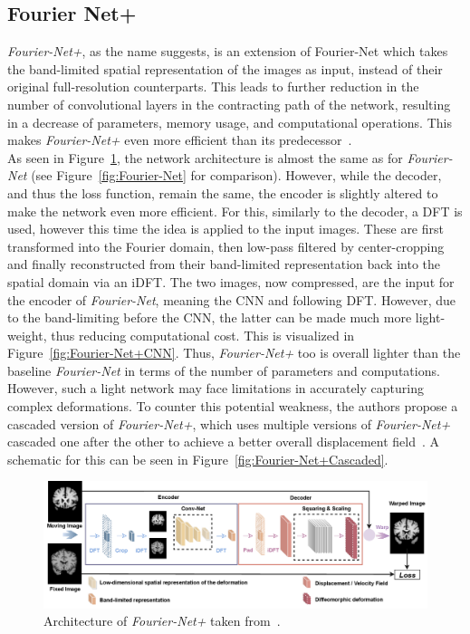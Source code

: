 \documentclass[english,version-2022-01]{uzl-thesis} %
\begin{document}
\subsection{Fourier Net+} \label{SubSec:Fourier-Net+}
\emph{Fourier-Net+}, as the name suggests, is an extension of Fourier-Net which takes the band-limited spatial representation of the images as input, instead of their original full-resolution counterparts. This leads to further reduction in the number of convolutional layers in the contracting path of the network, resulting in a decrease of parameters, memory usage, and computational operations. This makes \emph{Fourier-Net+} even more efficient than its predecessor~\cite{Fourier-Net+}.\\
As seen in Figure~\ref{fig:Fourier-Net+}, the network architecture is almost the same as for \emph{Fourier-Net} (see Figure~\ref{fig:Fourier-Net} for comparison). However, while the decoder, and thus the loss function, remain the same, the encoder is slightly altered to make the network even more efficient. For this, similarly to the decoder, a DFT is used, however this time the idea is applied to the input images. These are first transformed into the Fourier domain, then low-pass filtered by center-cropping and finally reconstructed from their band-limited representation back into the spatial domain via an iDFT. The two images, now compressed, are the input for the encoder of \emph{Fourier-Net}, meaning the CNN and following DFT. However, due to the band-limiting before the CNN, the latter can be made much more light-weight, thus reducing computational cost. This is visualized in Figure~\ref{fig:Fourier-Net+CNN}. Thus, \emph{Fourier-Net+} too is overall lighter than the baseline \emph{Fourier-Net} in terms of the number of parameters and computations. However, such a light network may face limitations in accurately capturing complex deformations. To counter this potential weakness, the authors propose a cascaded version of \emph{Fourier-Net+}, which uses multiple versions of \emph{Fourier-Net+} cascaded one after the other to achieve a better overall displacement field~\cite{Fourier-Net+}. A schematic for this can be seen in Figure~\ref{fig:Fourier-Net+Cascaded}.

\begin{figure}[htpb]
	\centering
	\graphicspath{{images/}{\main/images/}}
	\includegraphics[width=\linewidth]{ArchitectureFourier-Net+.png} 
	\caption{Architecture of \emph{Fourier-Net+} taken from~\cite{Fourier-Net+}.}
	\label{fig:Fourier-Net+}
\end{figure}
\end{document}
